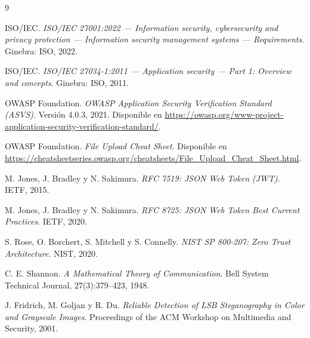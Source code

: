 \documentclass[11pt,a4paper]{article}
\begin{document}
\begin{thebibliography}{9}

ISO/IEC. \emph{ISO/IEC 27001:2022 --- Information security, cybersecurity and
privacy protection --- Information security management systems --- Requirements}.
Ginebra: ISO, 2022.

ISO/IEC. \emph{ISO/IEC 27034-1:2011 --- Application security --- Part 1: Overview
and concepts}. Ginebra: ISO, 2011.

OWASP Foundation. \emph{OWASP Application Security Verification Standard (ASVS)}.
Versión 4.0.3, 2021. Disponible en \url{https://owasp.org/www-project-application-security-verification-standard/}.

OWASP Foundation. \emph{File Upload Cheat Sheet}. Disponible en
\url{https://cheatsheetseries.owasp.org/cheatsheets/File_Upload_Cheat_Sheet.html}.

M. Jones, J. Bradley y N. Sakimura. \emph{RFC 7519: JSON Web Token (JWT)}.
IETF, 2015.

M. Jones, J. Bradley y N. Sakimura. \emph{RFC 8725: JSON Web Token Best Current
Practices}. IETF, 2020.

S. Rose, O. Borchert, S. Mitchell y S. Connelly. \emph{NIST SP 800-207: Zero Trust
Architecture}. NIST, 2020.

C. E. Shannon. \emph{A Mathematical Theory of Communication}. Bell System Technical
Journal, 27(3):379--423, 1948.

J. Fridrich, M. Goljan y R. Du. \emph{Reliable Detection of LSB Steganography in
Color and Grayscale Images}. Proceedings of the ACM Workshop on Multimedia and
Security, 2001.

\end{thebibliography}

\appendix
\end{document}
